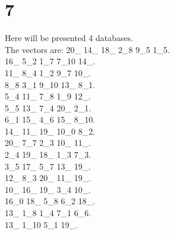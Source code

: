 \chapter{7}
\indent Here will be presented 4 databases.\\
The vectors are:
20\_ 14\_ 18\_ 2\_8 9\_5 1\_5.\\16\_ 5\_2 1\_7 7\_10 14\_.\\11\_ 8\_4 1\_2 9\_7 10\_.\\8\_8 3\_1 9\_10 13\_ 8\_1.\\5\_4 11\_ 7\_8 1\_9 12\_.\\5\_5 13\_ 7\_4 20\_ 2\_1.\\6\_1 15\_ 4\_6 15\_ 8\_10.\\14\_ 11\_ 19\_ 10\_0 8\_2.\\20\_ 7\_7 2\_3 10\_ 11\_.\\2\_4 19\_ 18\_ 1\_3 7\_3.\\3\_5 17\_ 5\_7 13\_ 19\_.\\12\_ 8\_3 20\_ 11\_ 19\_.\\10\_ 16\_ 19\_ 3\_4 10\_.\\16\_0 18\_ 5\_8 6\_2 18\_.\\13\_ 1\_8 1\_4 7\_1 6\_6.\\13\_ 1\_10 5\_1 19\_.\\
